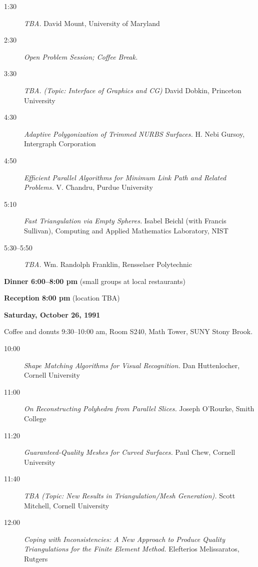 \begin{description}

\item[1:30]
{\it TBA.}
David Mount,
{\sf University of Maryland}

\item[2:30]
{\it Open Problem Session; Coffee Break.}

\item[3:30]
{\it TBA. (Topic: Interface of Graphics and CG)}
David Dobkin,
{\sf Princeton University}

\item[4:30] 
{\it Adaptive Polygonization of Trimmed NURBS Surfaces.}
H. Nebi Gursoy,
{\sf  Intergraph Corporation}

\item[4:50]
{\it Efficient Parallel Algorithms for Minimum Link Path and Related Problems.}
V. Chandru,
{\sf Purdue University}

\item[5:10]
{\it Fast Triangulation via Empty Spheres.}
Isabel Beichl (with Francis Sullivan),
{\sf Computing and Applied Mathematics Laboratory, NIST}

\item[5:30--5:50]
{\it TBA.}
Wm. Randolph Franklin,  %
{\sf Rensselaer Polytechnic}

\end{description}

{\bf  Dinner 6:00--8:00 pm} (small groups at local restaurants)

{\bf Reception 8:00 pm} (location TBA) 

\bigskip

{\normalsize\bf Saturday, October 26, 1991}

Coffee and donuts 9:30--10:00 am, Room S240, Math Tower, SUNY Stony Brook.

\vskip 10pt

\begin{description}
\item[10:00]
{\it Shape Matching Algorithms for Visual Recognition.}
Dan Huttenlocher,
{\sf Cornell University}

\item[11:00]
{\it On Reconstructing Polyhedra from Parallel Slices.}
Joseph O'Rourke,
{\sf Smith College}

\item[11:20]
{\it Guaranteed-Quality Meshes for Curved Surfaces.}
Paul Chew,
{\sf Cornell University}

\item[11:40]
{\it TBA (Topic: New Results in Triangulation/Mesh Generation).}
Scott Mitchell,
{\sf Cornell University}

\item[12:00]
{\it Coping with Inconsistencies: A New Approach to Produce Quality
Triangulations for the Finite Element Method.}
Elefterios Melissaratos,
{\sf Rutgers}
\end{description}

